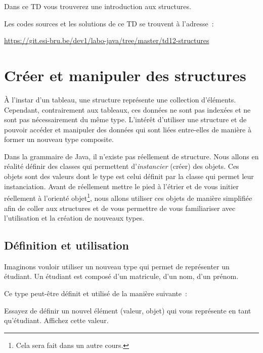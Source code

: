 \documentclass[a4paper,11pt]{article}
\date{2018 -- 2019}
\newcommand{\publicbasepath}{https://git.esi-bru.be/dev1/labo-java/tree/master/td12-structures}
\begin{document}
\entete
\titre
{}
\lastedit


	Dans ce TD vous trouverez une introduction aux structures.
	 
	Les codes sources et les solutions de ce TD se trouvent à l'adresse~: 
	
	\url{\publicbasepath}	


	\tableofcontents

	\newpage

\section{Créer et manipuler des structures}

	À l'instar d'un tableau, une structure représente une collection d'éléments. Cependant, contrairement aux tableaux, ces données ne sont pas indexées et ne sont pas nécessairement du même type. L'intérêt d'utiliser une structure et de pouvoir accéder et manipuler des données qui sont liées entre-elles de manière à former un nouveau type composite.

	Dans la grammaire de Java, il n'existe pas réellement de structure. Nous allons en réalité définir des classes qui permettent d'\emph{instancier} (créer) des objets. Ces objets sont des valeurs dont le type est celui définit par la classe qui permet leur instanciation.
	Avant de réellement mettre le pied à l'étrier et de vous initier réellement à l'orienté objet\footnote{Cela sera fait dans un autre cours.}, nous allons utiliser ces objets de manière simplifiée afin de coller aux structures et de vous permettre de vous familiariser avec l'utilisation et la création de nouveaux types.


	\subsection{Définition et utilisation}

	Imaginons vouloir utiliser un nouveau type qui permet de représenter un étudiant. Un étudiant est composé d'un matricule, d'un nom, d'un prénom.

	Ce type peut-être définit et utilisé de la manière suivante~:


	Essayez de définir un nouvel élément (valeur, objet) qui vous représente en tant qu'étudiant. Affichez cette valeur.
\end{document}
